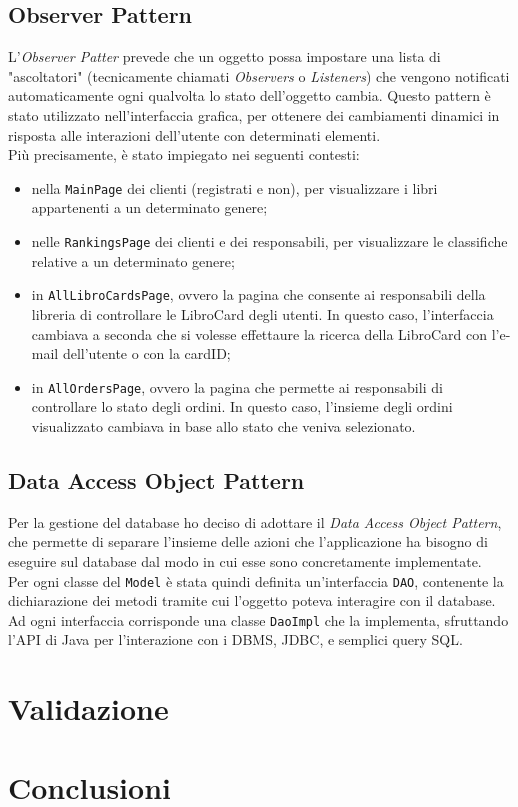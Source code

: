 \documentclass[12pt,a4paper]{article}
\begin{document}
	\subsection{Observer Pattern}
	L'\textit{Observer Patter} prevede che un oggetto possa impostare una lista di "ascoltatori" (tecnicamente chiamati \textit{Observers} o \textit{Listeners}) che vengono notificati automaticamente ogni qualvolta lo stato dell'oggetto cambia. 
	Questo pattern è stato utilizzato nell'interfaccia grafica, per ottenere dei cambiamenti dinamici in risposta alle interazioni dell'utente con determinati elementi. \\Più precisamente, è stato impiegato nei seguenti contesti:
	\begin{itemize}
		\item nella \texttt{MainPage} dei clienti (registrati e non), per visualizzare i libri appartenenti a un determinato genere;
		\item nelle \texttt{RankingsPage} dei clienti e dei responsabili, per visualizzare le classifiche relative a un determinato genere;
		\item in \texttt{AllLibroCardsPage}, ovvero la pagina che consente ai responsabili della libreria di controllare le LibroCard degli utenti. In questo caso, l'interfaccia cambiava a seconda che si volesse effettaure la ricerca della LibroCard con l'e-mail dell'utente o con la cardID;
		\item in \texttt{AllOrdersPage}, ovvero la pagina che permette ai responsabili di controllare lo stato degli ordini. In questo caso, l'insieme degli ordini visualizzato cambiava in base allo stato che veniva selezionato.
	\end{itemize}
	\subsection{Data Access Object Pattern}
	Per la gestione del database ho deciso di adottare il \textit{Data Access Object Pattern}, che permette di separare l'insieme delle azioni che l'applicazione ha bisogno di eseguire sul database dal modo in cui esse sono concretamente implementate.\\
	Per ogni classe del \texttt{Model} è stata quindi definita un'interfaccia \texttt{DAO}, contenente la dichiarazione dei metodi tramite cui l'oggetto poteva interagire con il database. Ad ogni interfaccia corrisponde una classe \texttt{DaoImpl} che la implementa, sfruttando l'API di Java per l'interazione con i DBMS, JDBC, e semplici query SQL.
	\section{Validazione}
	\section{Conclusioni}
\end{document}
